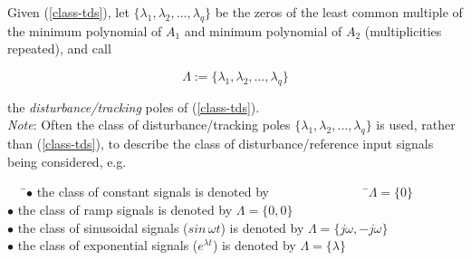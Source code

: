 \documentclass[a4paper]{article}
\theoremstyle{plain} %
{\theorembodyfont{\normalfont}
\newtheorem{Exa}{Example}}
\def\mp{minimum polynomial }
\def\dt{disturbance/tracking }
\begin{document}
Given (\ref{class-tds}), let $\{\lambda_1, \lambda_2, \ldots ,
\lambda_q \}$ be the zeros of the least common multiple of the \mp
of $A_1$ and \mp of $A_2$ (multiplicities repeated), and call

\begin{equation}
  \Lambda := \{\lambda_1, \lambda_2, \ldots ,\lambda_q \}
\end{equation}

the {\em \dt} poles\cite[pp.95--96]{masten1} of (\ref{class-tds}).\\%

{\em Note}: Often the class of \dt poles $\{\lambda_1, \lambda_2,
\ldots ,\lambda_q \}$ is used, rather than (\ref{class-tds}), to
describe the class of disturbance/reference input signals being
considered, e.g.

\begin{tabbing}
~~~\=$\bullet$ the class of constant signals is denoted by
~~~~~~~~~~~~~~~\=$\Lambda = \{0\}$ \\%
  \>$\bullet$ the class of ramp signals is denoted by  \>$\Lambda =
  \{0,0\}$ \\%
  \>$\bullet$ the class of sinusoidal signals ($sin \, \omega t$) is
  denoted by  \>$\Lambda = \{j\omega,-j\omega \}$ \\%
  \>$\bullet$ the class of exponential signals ($e^{\lambda t}$) is
  denoted by  \>$\Lambda = \{\lambda\}$ \\%
\end{tabbing}
\end{document}
